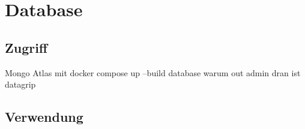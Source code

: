 \chapter{Database}\label{ch:db}

\section{Zugriff}
Mongo Atlas
mit docker compose up --build database
warum out admin dran ist
datagrip

\section{Verwendung}